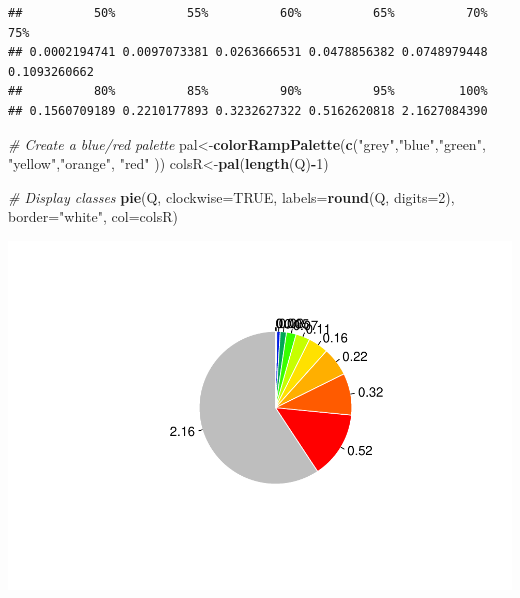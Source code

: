 \documentclass[
]{book}
\newenvironment{Shaded}{\begin{snugshade}}{\end{snugshade}}
\newcommand{\AttributeTok}[1]{\textcolor[rgb]{0.13,0.29,0.53}{#1}}
\newcommand{\CommentTok}[1]{\textcolor[rgb]{0.56,0.35,0.01}{\textit{#1}}}
\newcommand{\ConstantTok}[1]{\textcolor[rgb]{0.56,0.35,0.01}{#1}}
\newcommand{\DecValTok}[1]{\textcolor[rgb]{0.00,0.00,0.81}{#1}}
\newcommand{\FunctionTok}[1]{\textcolor[rgb]{0.13,0.29,0.53}{\textbf{#1}}}
\newcommand{\NormalTok}[1]{#1}
\newcommand{\OtherTok}[1]{\textcolor[rgb]{0.56,0.35,0.01}{#1}}
\newcommand{\SpecialCharTok}[1]{\textcolor[rgb]{0.81,0.36,0.00}{\textbf{#1}}}
\newcommand{\StringTok}[1]{\textcolor[rgb]{0.31,0.60,0.02}{#1}}
\begin{document}
\begin{verbatim}
##          50%          55%          60%          65%          70%          75% 
## 0.0002194741 0.0097073381 0.0263666531 0.0478856382 0.0748979448 0.1093260662 
##          80%          85%          90%          95%         100% 
## 0.1560709189 0.2210177893 0.3232627322 0.5162620818 2.1627084390
\end{verbatim}

\begin{Shaded}
\begin{Highlighting}[]
\CommentTok{\# Create a blue/red palette}
\NormalTok{pal}\OtherTok{\textless{}{-}}\FunctionTok{colorRampPalette}\NormalTok{(}\FunctionTok{c}\NormalTok{(}\StringTok{"grey"}\NormalTok{,}\StringTok{"blue"}\NormalTok{,}\StringTok{"green"}\NormalTok{, }\StringTok{"yellow"}\NormalTok{,}\StringTok{"orange"}\NormalTok{, }\StringTok{"red"}\NormalTok{ ))}
\NormalTok{colsR}\OtherTok{\textless{}{-}}\FunctionTok{pal}\NormalTok{(}\FunctionTok{length}\NormalTok{(Q)}\SpecialCharTok{{-}}\DecValTok{1}\NormalTok{)}

\CommentTok{\# Display classes}
\FunctionTok{pie}\NormalTok{(Q, }\AttributeTok{clockwise=}\ConstantTok{TRUE}\NormalTok{, }\AttributeTok{labels=}\FunctionTok{round}\NormalTok{(Q, }\AttributeTok{digits=}\DecValTok{2}\NormalTok{), }\AttributeTok{border=}\StringTok{"white"}\NormalTok{, }\AttributeTok{col=}\NormalTok{colsR)}
\end{Highlighting}
\end{Shaded}

\includegraphics{03-KDE_files/figure-latex/plot-KDE-1.pdf}
\end{document}
